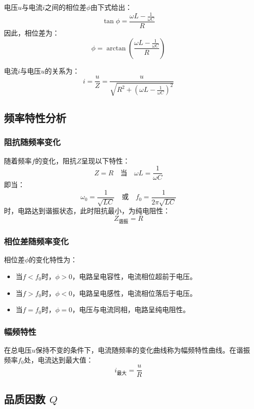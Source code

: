 \documentclass[zihao=5, UTF8]{article}
\theoremstyle{MyLineTheoremStyle} %
\theoremstyle{MyBlockTheoremStyle} %
\theoremstyle{MySubsubsectionStyle} %
\begin{document}
电压\( u \)与电流\( i \)之间的相位差\( \phi \)由下式给出：
\[
\tan \phi = \frac{\omega L - \frac{1}{\omega C}}{R}
\]
因此，相位差为：
\[
\phi = \arctan\left(\frac{\omega L - \frac{1}{\omega C}}{R}\right)
\]

电流\( i \)与电压\( u \)的关系为：
\[
i = \frac{u}{Z} = \frac{u}{\sqrt{R^2 + \left(\omega L - \frac{1}{\omega C}\right)^2}}
\]

\subsection{频率特性分析}

\subsubsection{阻抗随频率变化}

随着频率\( f \)的变化，阻抗\( Z \)呈现以下特性：
\[
Z = R \quad \text{当} \quad \omega L = \frac{1}{\omega C}
\]
即当：
\[
\omega_0 = \frac{1}{\sqrt{LC}} \quad \text{或} \quad f_0 = \frac{1}{2\pi\sqrt{LC}}
\]
时，电路达到谐振状态，此时阻抗最小，为纯电阻性：
\[
Z_{\text{谐振}} = R
\]

\subsubsection{相位差随频率变化}

相位差\( \phi \)的变化特性为：
\begin{itemize}
    \item 当\( f < f_0 \)时，\( \phi > 0 \)，电路呈电容性，电流相位超前于电压。
    \item 当\( f > f_0 \)时，\( \phi < 0 \)，电路呈电感性，电流相位落后于电压。
    \item 当\( f = f_0 \)时，\( \phi = 0 \)，电压与电流同相，电路呈纯电阻性。
\end{itemize}

\subsubsection{幅频特性}

在总电压\( u \)保持不变的条件下，电流随频率的变化曲线称为幅频特性曲线。在谐振频率\( f_0 \)处，电流达到最大值：
\[
i_{\text{最大}} = \frac{u}{R}
\]

\subsection{品质因数 \( Q \) }
\end{document}
